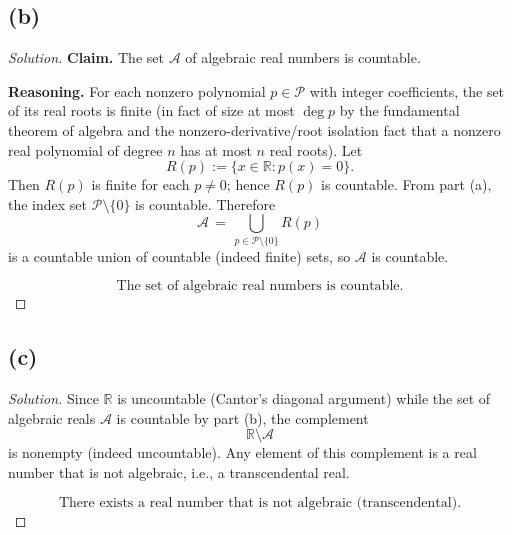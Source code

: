 \documentclass[12pt,a4paper]{article}
\theoremstyle{definition}
\theoremstyle{remark}
\newenvironment{solution}{\begin{proof}[Solution]}{\end{proof}}
\begin{document}
\subsection*{(b)}
\begin{solution}
\textbf{Claim.} The set $\mathcal A$ of algebraic real numbers is countable.

\textbf{Reasoning.} For each nonzero polynomial $p\in\mathcal P$ with integer coefficients, the set of its real roots is finite (in fact of size at most $\deg p$ by the fundamental theorem of algebra and the nonzero-derivative/root isolation fact that a nonzero real polynomial of degree $n$ has at most $n$ real roots). Let
\[
 R(p) := \{ x\in\mathbb R : p(x)=0 \}.
\]
Then $R(p)$ is finite for each $p\ne 0$; hence $R(p)$ is countable. From part (a), the index set $\mathcal P\setminus\{0\}$ is countable. Therefore
\[
 \mathcal A \,=\, \bigcup_{p\in \mathcal P\setminus\{0\}} R(p)
\]
is a countable union of countable (indeed finite) sets, so $\mathcal A$ is countable.

\[
 \boxed{\text{The set of algebraic real numbers is countable.}}
\]
\end{solution}

\subsection*{(c)}
\begin{solution}
Since $\mathbb R$ is uncountable (Cantor's diagonal argument) while the set of algebraic reals $\mathcal A$ is countable by part (b), the complement
\[
 \mathbb R\setminus \mathcal A
\]
is nonempty (indeed uncountable). Any element of this complement is a real number that is not algebraic, i.e., a transcendental real.

\[
 \boxed{\text{There exists a real number that is not algebraic (transcendental).}}
\]
\end{solution}
\end{document}
